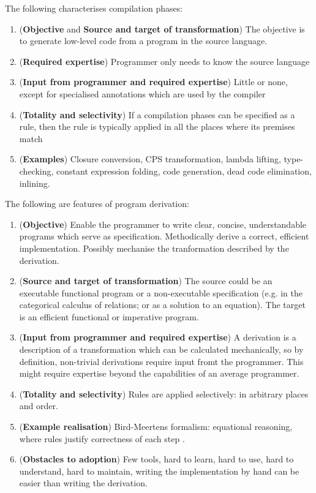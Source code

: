 \documentclass[bsc,frontabs,oneside,singlespacing,parskip,deptreport]{infthesis}
\theoremstyle{definition}
\theoremstyle{lemma}
\begin{document}
The following characterises compilation phases:

\begin{enumerate}
\item (\textbf{Objective} and \textbf{Source and target of
    transformation}) The objective is to generate low-level code from
  a program in the source language.
\item (\textbf{Required expertise}) Programmer only needs to know the
  source language
\item (\textbf{Input from programmer and required expertise}) Little or none, except for
  specialised annotations which are used by the compiler
\item (\textbf{Totality and selectivity}) If a compilation phases can
  be specified as a rule, then the rule is typically applied in all
  the places where its premises match
\item (\textbf{Examples}) Closure conversion, CPS transformation,
  lambda lifting, type-checking, constant expression folding, code
  generation, dead code elimination, inlining.
\end{enumerate}

The following are features of program derivation:

\begin{enumerate}
\item (\textbf{Objective}) Enable the programmer to write clear, concise,
  understandable programs which serve as specification. Methodically
  derive a correct, efficient implementation. Possibly mechanise the
  tranformation described by the derivation.
\item (\textbf{Source and target of transformation}) The source could be an
  executable functional program or a non-executable specification
  (e.g. in the categorical calculus of relations; or as a solution to
  an equation). The target is an efficient functional or imperative
  program. 
\item (\textbf{Input from programmer and required expertise}) A derivation is a
  description of a transformation which can be calculated
  mechanically, so by definition, non-trivial derivations require
  input fromt the programmer. This might require expertise beyond the
  capabilities of an average programmer.
\item (\textbf{Totality and selectivity}) Rules are applied selectively: in arbitrary places and order.
\item (\textbf{Example realisation}) Bird-Meertens formalism: equational
  reasoning, where rules justify correctness of each step \cite{gibbons1994introduction}.
\item (\textbf{Obstacles to adoption}) Few tools, hard to learn, hard to use,
  hard to understand, hard to maintain, writing the implementation by
  hand can be easier than writing the derivation.
\end{enumerate}
\end{document}
